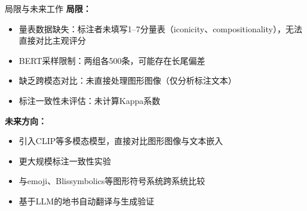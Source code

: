 \documentclass[aspectratio=169,xcolor=x11names,compress]{ctexbeamer}
\begin{document}
\begin{frame}{局限与未来工作}
\textbf{局限：}
\begin{itemize}
    \item 量表数据缺失：标注者未填写1--7分量表（iconicity、compositionality），无法直接对比主观评分
    \item BERT采样限制：两组各500条，可能存在长尾偏差
    \item 缺乏跨模态对比：未直接处理图形图像（仅分析标注文本）
    \item 标注一致性未评估：未计算Kappa系数
\end{itemize}

\vspace{0.5em}
\textbf{未来方向：}
\begin{itemize}
    \item 引入CLIP等多模态模型，直接对比图形图像与文本嵌入
    \item 更大规模标注一致性实验
    \item 与emoji、Blissymbolics等图形符号系统跨系统比较
    \item 基于LLM的地书自动翻译与生成验证
\end{itemize}
\end{frame}
\end{document}
